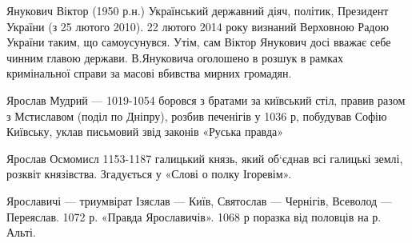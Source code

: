 Янукович Віктор (1950 р.н.) Український державний діяч, політик, Президент України (з 25 лютого 2010). 22 лютого 2014 року визнаний Верховною Радою України таким, що самоусунувся. Утім, сам Віктор Янукович досі вважає себе чинним главою держави. В.Януковича оголошено в розшук в рамках кримінальної справи за масові вбивства мирних громадян.

Ярослав Мудрий --- 1019-1054 боровся з братами за київський стіл, правив разом з Мстиславом (поділ по Дніпру), розбив печенігів у 1036 р, побудував Софію Київську, уклав письмовий звід законів «Руська правда»

Ярослав Осмомисл 1153-1187 галицький князь, який об‘єднав всі галицькі землі, розквіт князівства. Згадується у «Слові о полку Ігоревім».

Ярославичі --- триумвірат Ізяслав --- Київ, Святослав --- Чернігів, Всеволод --- Переяслав. 1072 р. «Правда Ярославичів». 1068 р поразка від половців на р. Альті.


